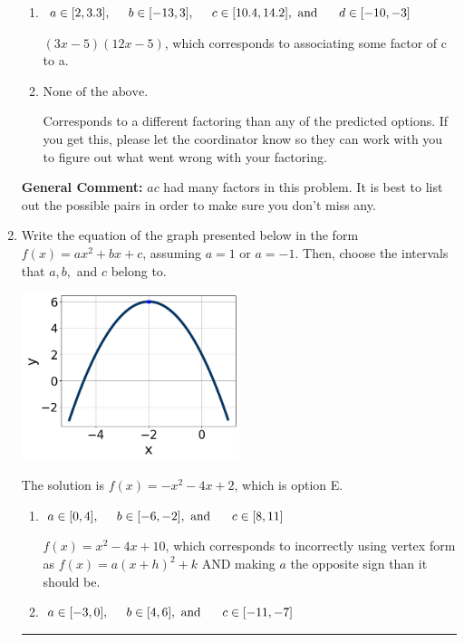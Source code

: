 \documentclass{extbook}[14pt]
\newcommand{\litem}[1]{\item #1

\rule{\textwidth}{0.4pt}}
\begin{document}
\begin{enumerate}
{\begin{enumerate}[label=\Alph*.]
 $(x -30)(x -30)$, which corresponds to factoring $x^{2} -60 x + 900$.
\item \( a \in [2, 3.3], \hspace*{5mm} b \in [-13, 3], \hspace*{5mm} c \in [10.4, 14.2], \text{ and } \hspace*{5mm} d \in [-10, -3] \)

 $(3x -5)(12x -5)$, which corresponds to associating some factor of c to a.
\item \( \text{None of the above.} \)

 Corresponds to a different factoring than any of the predicted options. If you get this, please let the coordinator know so they can work with you to figure out what went wrong with your factoring.
\end{enumerate}

\textbf{General Comment:} $ac$ had many factors in this problem. It is best to list out the possible pairs in order to make sure you don't miss any.
}
\litem{
Write the equation of the graph presented below in the form $f(x)=ax^2+bx+c$, assuming  $a=1$ or $a=-1$. Then, choose the intervals that $a, b,$ and $c$ belong to.

\begin{center}
    \includegraphics[width=0.5\textwidth]{../Figures/quadraticGraphToEquationCopyA.png}
\end{center}


The solution is \( f(x) = -x^{2} -4 x + 2 \), which is option E.\begin{enumerate}[label=\Alph*.]
\item \( a \in [0, 4], \hspace*{5mm} b \in [-6, -2], \text{ and } \hspace*{5mm} c \in [8, 11] \)

$f(x)=x^{2} -4 x + 10$, which corresponds to incorrectly using vertex form as $f(x) = a(x+h)^2+k$ AND making $a$ the opposite sign than it should be.
\item \( a \in [-3, 0], \hspace*{5mm} b \in [4, 6], \text{ and } \hspace*{5mm} c \in [-11, -7] \)


\end{enumerate}}
\end{enumerate}
\end{document}
